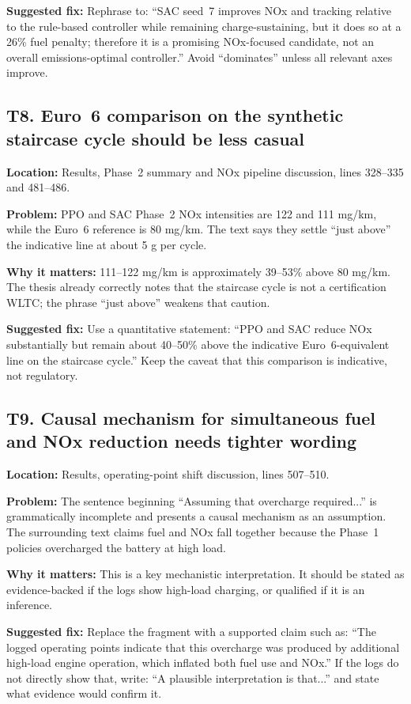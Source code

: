 \documentclass[11pt,a4paper]{article}
\newcommand{\loc}[1]{\textbf{Location:} #1\par}
\newcommand{\problem}{\textbf{Problem:} }
\newcommand{\why}{\textbf{Why it matters:} }
\newcommand{\fix}{\textbf{Suggested fix:} }
\begin{document}
\fix Rephrase to: ``SAC seed~7 improves NOx and tracking relative to the rule-based controller while remaining charge-sustaining, but it does so at a 26\% fuel penalty; therefore it is a promising NOx-focused candidate, not an overall emissions-optimal controller.'' Avoid ``dominates'' unless all relevant axes improve.

\subsection*{T8. Euro~6 comparison on the synthetic staircase cycle should be less casual}

\loc{Results, Phase~2 summary and NOx pipeline discussion, lines 328--335 and 481--486.}
\problem PPO and SAC Phase~2 NOx intensities are 122 and 111 mg/km, while the Euro~6 reference is 80 mg/km. The text says they settle ``just above'' the indicative line at about 5 g per cycle.

\why 111--122 mg/km is approximately 39--53\% above 80 mg/km. The thesis already correctly notes that the staircase cycle is not a certification WLTC; the phrase ``just above'' weakens that caution.

\fix Use a quantitative statement: ``PPO and SAC reduce NOx substantially but remain about 40--50\% above the indicative Euro~6-equivalent line on the staircase cycle.'' Keep the caveat that this comparison is indicative, not regulatory.

\subsection*{T9. Causal mechanism for simultaneous fuel and NOx reduction needs tighter wording}

\loc{Results, operating-point shift discussion, lines 507--510.}
\problem The sentence beginning ``Assuming that overcharge required...'' is grammatically incomplete and presents a causal mechanism as an assumption. The surrounding text claims fuel and NOx fall together because the Phase~1 policies overcharged the battery at high load.

\why This is a key mechanistic interpretation. It should be stated as evidence-backed if the logs show high-load charging, or qualified if it is an inference.

\fix Replace the fragment with a supported claim such as: ``The logged operating points indicate that this overcharge was produced by additional high-load engine operation, which inflated both fuel use and NOx.'' If the logs do not directly show that, write: ``A plausible interpretation is that...'' and state what evidence would confirm it.
\end{document}
